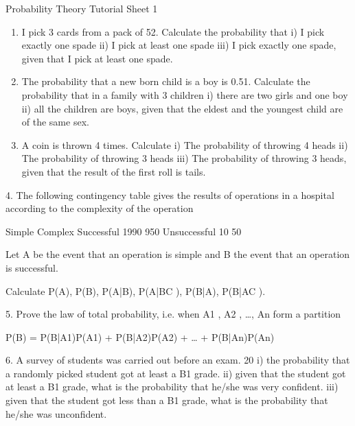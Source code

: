 \documentclass[]{report}
\begin{document}
	
	Probability Theory
	Tutorial Sheet 1

\begin{enumerate}
	\item I pick 3 cards from a pack of 52. Calculate the probability that 
	i)	I pick exactly one spade
	ii)	I pick at least one spade
	iii)	I pick exactly one spade, given that I pick at least one spade.
	
\item The probability that a new born child is a boy is 0.51. Calculate the probability that in a family with 3 children
	i)	there are two girls and one boy
	ii)	all the children are boys, given that the eldest and the youngest child are of the same sex.
	
\item	A coin is thrown 4 times. Calculate 
	i)	The probability of throwing 4 heads
	ii)	The probability of throwing 3 heads 
	iii)	The probability of throwing 3 heads, given that the result of the first roll is tails.
\end{enumerate}	

	
	4.	The following contingency table gives the results of operations in a hospital according to the complexity of the operation
	
	Simple	Complex
	Successful	1990	950
	Unsuccessful	10	50
	
	Let A be the event that an operation is simple and B the event that an operation is successful. 
	
	Calculate P(A), P(B), P(A|B), P(A|BC ), P(B|A), P(B|AC ).
	
	5. Prove the law of total probability, i.e. when A1 , A2 , …, An form a partition
	
	P(B) = P(B|A1)P(A1) + P(B|A2)P(A2) + … + P(B|An)P(An)
	
	6. A survey of students was carried out before an exam. 20%
	i)	the probability that a randomly picked student  got at least a B1 grade.
	ii)	given that the student got at least a B1 grade, what is the probability that he/she was very confident.
	iii)	given that the student got less than a B1 grade, what is the probability that he/she was unconfident.
	
\end{document}
